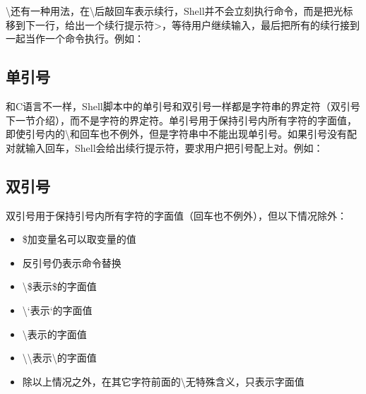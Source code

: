 \textbackslash{}还有一种用法，在\textbackslash{}后敲回车表示续行，Shell并不会立刻执行命令，而是把光标移到下一行，给出一个续行提示符\textgreater{}，等待用户继续输入，最后把所有的续行接到一起当作一个命令执行。例如：



\subsection{单引号}
%


和C语言不一样，Shell脚本中的单引号和双引号一样都是字符串的界定符（双引号下一节介绍），而不是字符的界定符。单引号用于保持引号内所有字符的字面值，即使引号内的\textbackslash{}和回车也不例外，但是字符串中不能出现单引号。如果引号没有配对就输入回车，Shell会给出续行提示符，要求用户把引号配上对。例如：



\subsection{双引号}
%


双引号用于保持引号内所有字符的字面值（回车也不例外），但以下情况除外：


\begin{itemize}

\item \$加变量名可以取变量的值

\item 反引号仍表示命令替换

\item \textbackslash{}\$表示\$的字面值

\item \textbackslash{}`表示`的字面值

\item \textbackslash{}\BookQuoteChar{}表示\BookQuoteChar{}的字面值

\item \textbackslash{}\textbackslash{}表示\textbackslash{}的字面值

\item 除以上情况之外，在其它字符前面的\textbackslash{}无特殊含义，只表示字面值
\end{itemize}




